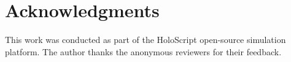 \documentclass[letterpaper,twocolumn,10pt]{article}
\newcommand{\holoscript}{HoloScript}
\begin{document}

\section*{Acknowledgments}

This work was conducted as part of the \holoscript{} open-source simulation
platform. The author thanks the anonymous reviewers for their feedback.




\end{document}
